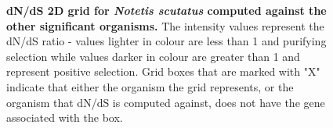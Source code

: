 \documentclass{article}
\begin{document}
\begin{figure}[H]
\centering
{}
\caption{\textbf{dN/dS 2D grid for \textit{Notetis scutatus} computed against the other significant organisms.} The intensity values represent the dN/dS ratio - values lighter in colour are less than 1 and purifying selection while values darker in colour are greater than 1 and represent positive selection. Grid boxes that are marked with "X" indicate that either the organism the grid represents, or the organism that dN/dS is computed against, does not have the gene associated with the box.}
\label{sup_fig_29}
\end{figure}
\end{document}
